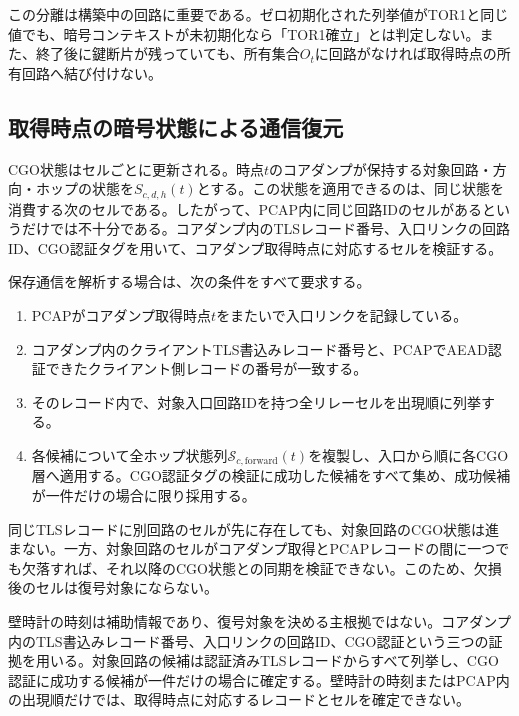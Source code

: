 \documentclass[10pt,a4paper]{ltjsarticle}
\newcommand{\torone}{\textsc{TOR1}}
\begin{document}
この分離は構築中の回路に重要である。ゼロ初期化された列挙値が\torone{}と同じ値でも、暗号コンテキストが未初期化なら「\torone{}確立」とは判定しない。また、終了後に鍵断片が残っていても、所有集合$O_t$に回路がなければ取得時点の所有回路へ結び付けない。

\subsection{取得時点の暗号状態による通信復元}

CGO状態はセルごとに更新される。時点$t$のコアダンプが保持する対象回路・方向・ホップの状態を$S_{c,d,h}(t)$とする。この状態を適用できるのは、同じ状態を消費する次のセルである。したがって、PCAP内に同じ回路IDのセルがあるというだけでは不十分である。コアダンプ内のTLSレコード番号、入口リンクの回路ID、CGO認証タグを用いて、コアダンプ取得時点に対応するセルを検証する。

保存通信を解析する場合は、次の条件をすべて要求する。

\begin{enumerate}
  \item PCAPがコアダンプ取得時点$t$をまたいで入口リンクを記録している。
  \item コアダンプ内のクライアントTLS書込みレコード番号と、PCAPでAEAD認証できたクライアント側レコードの番号が一致する。
  \item そのレコード内で、対象入口回路IDを持つ全リレーセルを出現順に列挙する。
  \item 各候補について全ホップ状態列$\mathcal{S}_{c,\mathrm{forward}}(t)$を複製し、入口から順に各CGO層へ適用する。CGO認証タグの検証に成功した候補をすべて集め、成功候補が一件だけの場合に限り採用する。
\end{enumerate}

同じTLSレコードに別回路のセルが先に存在しても、対象回路のCGO状態は進まない。一方、対象回路のセルがコアダンプ取得とPCAPレコードの間に一つでも欠落すれば、それ以降のCGO状態との同期を検証できない。このため、欠損後のセルは復号対象にならない。

壁時計の時刻は補助情報であり、復号対象を決める主根拠ではない。コアダンプ内のTLS書込みレコード番号、入口リンクの回路ID、CGO認証という三つの証拠を用いる。対象回路の候補は認証済みTLSレコードからすべて列挙し、CGO認証に成功する候補が一件だけの場合に確定する。壁時計の時刻またはPCAP内の出現順だけでは、取得時点に対応するレコードとセルを確定できない。
\end{document}
